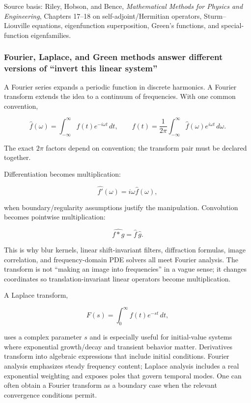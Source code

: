 Source basis: Riley, Hobson, and Bence, \emph{Mathematical Methods for Physics and Engineering}, Chapters 17--18 on self-adjoint/Hermitian operators, Sturm--Liouville equations, eigenfunction superposition, Green's functions, and special-function eigenfamilies.

\subsubsection{Fourier, Laplace, and Green methods answer different versions of ``invert this linear system''}\label{02-foundations-ii-ch025-fourier-laplace-and-green-methods-answer-different-versions-of-invert-this-linear-system}

A Fourier series expands a periodic function in discrete harmonics. A Fourier transform extends the idea to a continuum of frequencies. With one common convention,

\[
\hat f(\omega)
=
\int_{-\infty}^{\infty}
f(t)e^{-i\omega t}\,dt,
\qquad
f(t)
=
\frac{1}{2\pi}
\int_{-\infty}^{\infty}
\hat f(\omega)e^{i\omega t}\,d\omega.
\]

The exact \(2\pi\) factors depend on convention; the transform pair must be declared together.

Differentiation becomes multiplication:

\[
\widehat{f'}(\omega)=i\omega\hat f(\omega),
\]

when boundary/regularity assumptions justify the manipulation. Convolution becomes pointwise multiplication:

\[
\widehat{f*g}
=
\hat f\,\hat g.
\]

This is why blur kernels, linear shift-invariant filters, diffraction formulas, image correlation, and frequency-domain PDE solvers all meet Fourier analysis. The transform is not ``making an image into frequencies'' in a vague sense; it changes coordinates so translation-invariant linear operators become multiplication.

A Laplace transform,

\[
F(s)
=
\int_0^\infty
f(t)e^{-st}\,dt,
\]

uses a complex parameter \(s\) and is especially useful for initial-value systems where exponential growth/decay and transient behavior matter. Derivatives transform into algebraic expressions that include initial conditions. Fourier analysis emphasizes steady frequency content; Laplace analysis includes a real exponential weighting and exposes poles that govern temporal modes. One can often obtain a Fourier transform as a boundary case when the relevant convergence conditions permit.


